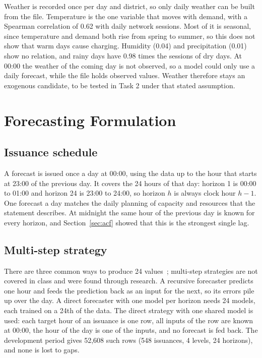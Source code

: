 \documentclass[12pt,a4paper,openany]{report}
\begin{document}
Weather is recorded once per day and district, so only daily weather can be built from the file. Temperature is the
one variable that moves with demand, with a Spearman correlation of 0.62 with daily network sessions. Most of it is
seasonal, since temperature and demand both rise from spring to summer, so this does not show that warm days cause
charging. Humidity (0.04) and precipitation (0.01) show no relation, and rainy days have 0.98 times the sessions of
dry days. At 00:00 the weather of the coming day is not observed, so a model could only use a daily forecast, while
the file holds observed values. Weather therefore stays an exogenous candidate, to be tested in Task 2 under that
stated assumption.

\chapter{Forecasting Formulation}\label{ch:formulation}

\section{Issuance schedule}\label{sec:issuance}

A forecast is issued once a day at 00:00, using the data up to the hour that starts at 23:00 of the previous day. It
covers the 24 hours of that day: horizon 1 is 00:00 to 01:00 and horizon 24 is 23:00 to 24:00, so horizon $h$ is
always clock hour $h-1$. One forecast a day matches the daily planning of capacity and resources that the statement
describes. At midnight the same hour of the previous day is known for every horizon, and Section~\ref{sec:acf}
showed that this is the strongest single lag.

\section{Multi-step strategy}\label{sec:strategy}

There are three common ways to produce 24 values~\cite{bentaieb2012}; multi-step strategies are not covered in
class and were found through research. A recursive forecaster predicts one hour and feeds the prediction back
as an input for the next, so its errors pile up over the day. A direct forecaster with one model per horizon needs 24
models, each trained on a 24th of the data. The direct strategy with one shared model is used: each target hour of an
issuance is one row, all inputs of the row are known at 00:00, the hour of the day is one of the inputs, and no
forecast is fed back. The development period gives 52,608 such rows (548 issuances, 4 levels, 24 horizons), and none
is lost to gaps.
\end{document}
